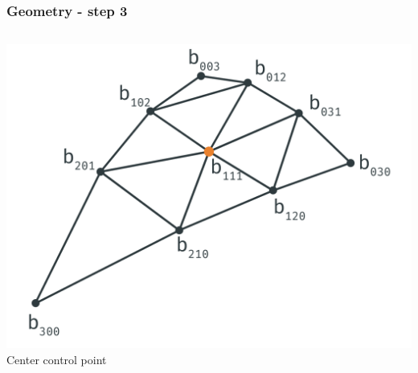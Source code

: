 	\begin{frame}\frametitle{Geometry - step 3}
		\begin{columns}
			\begin{column}{0.6\textwidth}
				\begin{center}
				\includegraphics[width=\textwidth]{img/1_single/geometry_3.png}
				\small{Center control point}
				\end{center}
			\end{column}
		\end{columns}
	\end{frame}	

